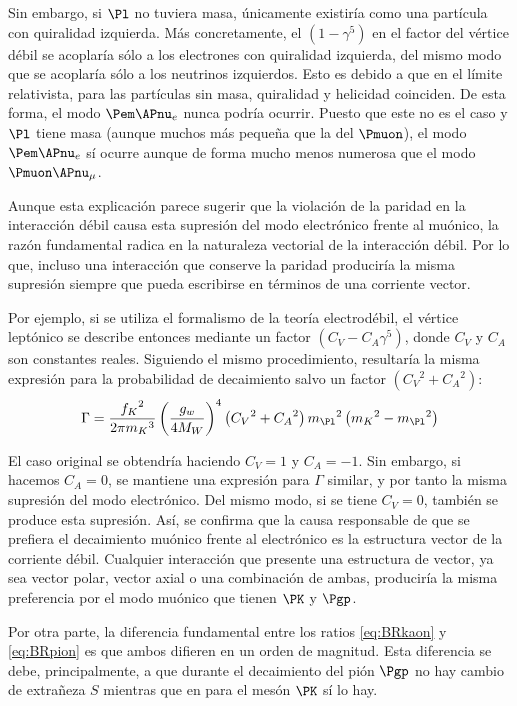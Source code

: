 Sin embargo, si $\Pl$ no tuviera masa, únicamente existiría como una partícula con quiralidad izquierda. Más concretamente, el $\left( 1-\gamma^{5} \right)$ en el factor del vértice débil se acoplaría sólo a los electrones con quiralidad izquierda, del mismo modo que se acoplaría sólo a los neutrinos izquierdos. Esto es debido a que en el límite relativista, para las partículas sin masa, quiralidad y helicidad coinciden. De esta forma, el modo $\Pem \APnu_{e}$ nunca podría ocurrir. Puesto que este no es el caso y $\Pl$ tiene masa (aunque muchos más pequeña que la del $\Pmuon$), el modo $\Pem \APnu_{e}$ sí ocurre aunque de forma mucho menos numerosa que el modo $\Pmuon \APnu_{\mu}$.

Aunque esta explicación parece sugerir que la violación de la paridad en la interacción débil causa esta supresión del modo electrónico frente al muónico, la razón fundamental radica en la naturaleza vectorial de la interacción débil. Por lo que, incluso una interacción que conserve la paridad produciría la misma supresión siempre que pueda escribirse en términos de una corriente vector. 

Por ejemplo, si se utiliza el formalismo de la teoría electrodébil, el vértice leptónico se describe entonces mediante un factor $\left( C_{V}-C_{A}\gamma^{5} \right)$, donde $C_{V}$ y $C_{A}$ son constantes reales. Siguiendo el mismo procedimiento, resultaría la misma expresión para la probabilidad de decaimiento salvo un factor  $\left( {C_{V}}^2+{C_{A}}^2\right)$:
\begin{equation}
\Gamma =\dfrac{{f_{K}}^{2}}{2\pi {m_{K}}^{3}}\left( \dfrac{g_w}{4M_W}\right)^{4}\left( {C_{V}}^2+{C_{A}}^2\right){m_{\Pl}}^{2}\left({m_{K}}^{2}-{m_{\Pl}}^{2}\right)\label{eq:decayrateEWt}
\end{equation}

El caso original se obtendría haciendo $C_{V}=1$ y $C_{A}=-1$. Sin embargo, si hacemos $C_{A}=0$, se mantiene una expresión para $\Gamma$ similar, y por tanto la misma supresión del modo electrónico. Del mismo modo, si se tiene $C_{V}=0$, también se produce esta supresión. Así, se confirma que la causa responsable de que se prefiera el decaimiento muónico frente al electrónico es la estructura vector de la corriente débil. Cualquier interacción que presente una estructura de vector, ya sea vector polar, vector axial o una combinación de ambas, produciría la misma preferencia por el modo muónico que tienen $\PK$ y $\Pgp$.

Por otra parte, la diferencia fundamental entre los ratios \ref{eq:BRkaon} y \ref{eq:BRpion} es que ambos difieren en un orden de magnitud. Esta diferencia se debe, principalmente, a que durante el decaimiento del pión $\Pgp$ no hay cambio de extrañeza $S$ mientras que en para el mesón $\PK$ sí lo hay.